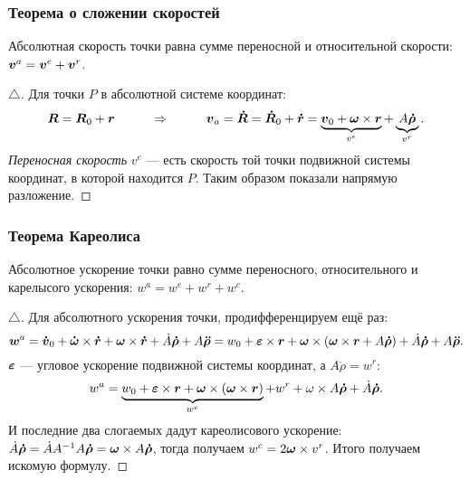\subsubsection*{Теорема о сложении скоростей}
\begin{to_thr}
	Абсолютная скорость точки равна сумме переносной и относительной скорости: $\mbox{\boldmath $v$}^a = \mbox{\boldmath $v$}^e + \mbox{\boldmath $v$}^r$.
\end{to_thr}
\begin{proof}[$\triangle$]
	Для точки $P$ в абсолютной системе координат:
	\begin{equation*}
		\mbox{\boldmath $R$} = \mbox{\boldmath $R$}_0 + \mbox{\boldmath $r$}
		\hspace*{1 cm}
		\Rightarrow
		\hspace*{1 cm}
		\mbox{\boldmath $v$}_a = \mbox{\boldmath $\dot{R}$} = \mbox{\boldmath $\dot{R}$}_0 + \mbox{\boldmath $\dot{r}$} = \underbrace{\mbox{\boldmath $v$}_0 + \mbox{\boldmath $\omega$}\times \mbox{\boldmath $r$}}_{v^e} + \underbrace{A \mbox{\boldmath $\dot{\rho}$}}_{v^r}.
	\end{equation*}
	\textit{Переносная скорость} $v^e$ --- есть скорость той точки подвижной системы координат, в которой находится $P$.
	Таким образом показали напрямую разложение.
\end{proof}

\subsubsection*{Теорема Кареолиса}
\begin{to_thr}
	Абсолютное ускорение точки равно сумме переносного, относительного и карелысого ускорения: $w^a = w^e + w^r + w^c$.
\end{to_thr}
\begin{proof}[$\triangle$]
	Для абсолютного ускорения точки, продифференцируем ещё раз:
	\begin{equation*}
		\mbox{\boldmath $w$}^a = \mbox{\boldmath $\dot{v}$}_0 + \mbox{\boldmath $\dot{\omega}$} \times \mbox{\boldmath $\dot{r}$} + \mbox{\boldmath $\omega$} \times \mbox{\boldmath $\dot{r}$} + \dot{A} \mbox{\boldmath $\dot{\rho}$} + A \mbox{\boldmath $\ddot{\rho}$} = w_0 + \mbox{\boldmath $\varepsilon$} \times \mbox{\boldmath $r$} + \mbox{\boldmath $\omega$} \times (\mbox{\boldmath $\omega$} \times \mbox{\boldmath $r$} + A \mbox{\boldmath $\dot{\rho}$}) + \dot{A} \mbox{\boldmath $\dot{\rho}$} + A \mbox{\boldmath $\ddot{\rho}$}.
	\end{equation*}
	$\mbox{\boldmath $\varepsilon$}$ --- угловое ускорение подвижной системы координат, а $A \ddot{\rho} = w^r$:
	\begin{equation*}
		w^a = \underbrace{ w_0 + \mbox{\boldmath $\varepsilon$} \times \mbox{\boldmath $r$} + \mbox{\boldmath $\omega$} \times (\mbox{\boldmath $\omega$} \times \mbox{\boldmath $r$})}_{w^e} + w^r + \omega \times A \mbox{\boldmath $\dot{\rho}$} + \dot{A} \mbox{\boldmath $\dot{\rho}$}.
	\end{equation*}
	И последние два слогаемых дадут кареолисового ускорение: $\dot{A} \mbox{\boldmath $\dot{\rho}$} = \dot{A} A^{-1} A \mbox{\boldmath $\dot{\rho}$} = \mbox{\boldmath $\omega$} \times A \mbox{\boldmath $\dot{\rho}$} $, тогда получаем $w^c = 2 \mbox{\boldmath $\omega$} \times v^r$. Итого получаем искомую формулу.
\end{proof}
